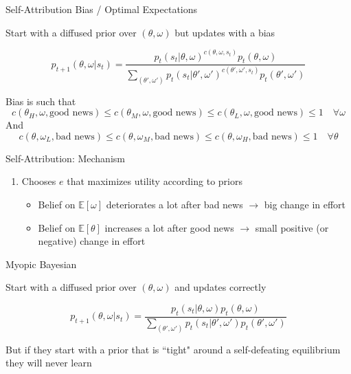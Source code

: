 \documentclass[aspectratio=169]{beamer}
\begin{document}
\begin{frame}{Self-Attribution Bias / Optimal Expectations}

    Start with a diffused prior over $(\theta, \omega)$ but updates with a bias

    $$ p_{t+1}(\theta, \omega| s_t)=\frac{p_t(s_t|\theta, \omega)^{c(\theta, \omega, s_t)}p_t(\theta, \omega)}{\sum_{(\theta', \omega')}p_t(s_t|\theta', \omega')^{c(\theta', \omega', s_t)}p_t(\theta', \omega')} $$

    Bias is such that 
    $$c(\theta_H, \omega, \text{good news}) \leq c(\theta_M, \omega, \text{good news}) \leq c(\theta_L, \omega, \text{good news})\leq1 \quad \forall \omega$$
    And
    $$c(\theta, \omega_L, \text{bad news}) \leq c(\theta, \omega_M, \text{bad news}) \leq c(\theta, \omega_H, \text{bad news})\leq1 \quad \forall \theta$$
    

\end{frame}

\begin{frame}{Self-Attribution: Mechanism}
    \begin{enumerate}
        \item Chooses $e$ that maximizes utility according to priors
        \bigskip
        \begin{itemize}
            \item Belief on $\mathbb{E}[\omega]$ deteriorates a lot after bad news $\to$ big change in effort
            \item Belief on $\mathbb{E}[\theta]$ increases a lot after good news $\to$ small positive (or negative) change in effort \\
        \end{itemize}
    \end{enumerate}

    \label{sspath}
    
\end{frame}


\begin{frame}{Myopic Bayesian}

    Start with a diffused prior over $(\theta, \omega)$ and updates correctly
    
    $$ p_{t+1}(\theta, \omega| s_t)=\frac{p_t(s_t|\theta, \omega)p_t(\theta, \omega)}{\sum_{(\theta', \omega')}p_t(s_t|\theta', \omega')p_t(\theta', \omega')} $$
    
    But if they start with a prior that is ``tight" 
    around a self-defeating equilibrium they will never learn 
        
\end{frame}
\end{document}
